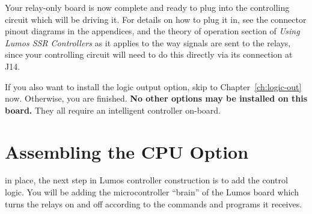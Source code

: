\documentclass[letterpaper,twoside,onecolumn,openright,final]{memoir}
\begin{document}
Your relay-only board is now complete and ready to plug into the controlling circuit which will
be driving it.  For details on how to plug it in, see the connector pinout diagrams in the appendices,
and the theory of operation section of \emph{Using Lumos SSR Controllers} as it applies to the way
signals are sent to the relays, since your controlling circuit will need to do this directly via
its connection at J14.

If you also want to install the logic output option, skip to Chapter~\ref{ch:logic-out} now.  Otherwise,
you are finished.  {\bfseries No other options may be installed on this board.} They all require
an intelligent controller on-board.

\bigskip


\chapter{Assembling the CPU Option}\label{ch:cpu}
 in place, the next step in Lumos controller construction
is to add the control logic.  You will be adding the microcontroller ``brain'' of the Lumos board
which turns the relays on and off according to the commands and programs it receives.
\end{document}

